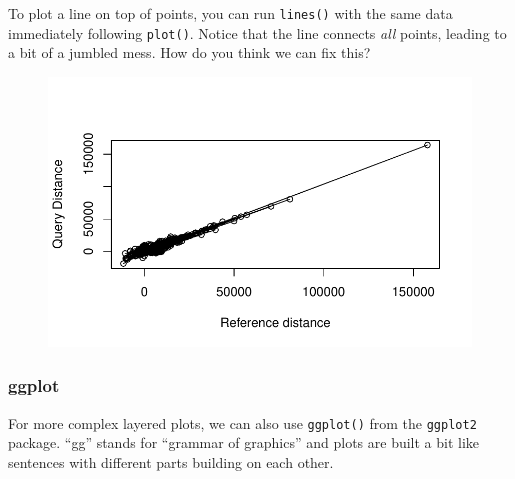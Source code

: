\documentclass[
  letterpaper,
  DIV=11,
  numbers=noendperiod]{scrreprt}
\newenvironment{Shaded}{\begin{snugshade}}{\end{snugshade}}
\newcommand{\AttributeTok}[1]{\textcolor[rgb]{0.40,0.45,0.13}{#1}}
\newcommand{\DocumentationTok}[1]{\textcolor[rgb]{0.37,0.37,0.37}{\textit{#1}}}
\newcommand{\FunctionTok}[1]{\textcolor[rgb]{0.28,0.35,0.67}{#1}}
\newcommand{\NormalTok}[1]{\textcolor[rgb]{0.00,0.23,0.31}{#1}}
\newcommand{\SpecialCharTok}[1]{\textcolor[rgb]{0.37,0.37,0.37}{#1}}
\newcommand{\StringTok}[1]{\textcolor[rgb]{0.13,0.47,0.30}{#1}}
\begin{document}
To plot a line on top of points, you can run \texttt{lines()} with the
same data immediately following \texttt{plot()}. Notice that the line
connects \emph{all} points, leading to a bit of a jumbled mess. How do
you think we can fix this?

\begin{Shaded}
\end{Shaded}

\begin{figure}[H]

{\centering \includegraphics{scripts/02_dataViz/class3_files/figure-pdf/unnamed-chunk-5-1.pdf}

}

\end{figure}

\hypertarget{ggplot}{%
\subsubsection{ggplot}\label{ggplot}}

For more complex layered plots, we can also use \texttt{ggplot()} from
the \texttt{ggplot2} package. ``gg'' stands for ``grammar of graphics''
and plots are built a bit like sentences with different parts building
on each other.
\end{document}
